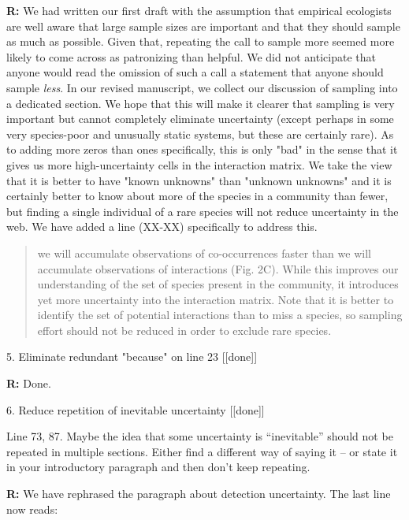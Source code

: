 \documentclass[12pt]{letter}
\newenvironment{refquote}{\bigskip \begin{it}}{\end{it}\smallskip}
\begin{document}
\begin{itemize}
		\textbf{R:} We had written our first draft with the assumption that empirical ecologists are well aware that large sample sizes are important and that they should sample as much as possible. Given that, repeating the call to sample more seemed more likely to come across as patronizing than helpful. We did not anticipate that anyone would read the omission of such a call a statement that anyone should sample \emph{less}. In our revised manuscript, we collect our discussion of sampling into a dedicated section. We hope that this will make it clearer that sampling is very important but cannot completely eliminate uncertainty (except perhaps in some very species-poor and unusually static systems, but these are certainly rare). As to adding more zeros than ones specifically, this is only "bad" in the sense that it gives us more high-uncertainty cells in the interaction matrix. We take the view that it is better to have "known unknowns" than "unknown unknowns" and it is certainly better to know about more of the species in a community than fewer, but finding a single individual of a rare species will not reduce uncertainty in the web. We have added a line (XX-XX) specifically to address this.

		\begin{quotation}
			we will accumulate observations of co-occurrences faster than we will accumulate observations of interactions (Fig. 2C). While this improves our understanding of the set of species present in the community, it introduces yet more uncertainty into the interaction matrix. Note that it is better to identify the set of potential interactions than to miss a species, so sampling effort should not be reduced in order to exclude rare species.
		\end{quotation}


	5. Eliminate redundant "because" on line 23 [[done]]

		\textbf{R:} Done.


	6. Reduce repetition of inevitable uncertainty [[done]]

		\begin{refquote}
		Line 73, 87.  Maybe the idea that some uncertainty is “inevitable” should not be repeated in multiple sections.  Either find a different way of saying it – or state it in your introductory paragraph and then don’t keep repeating.
		\end{refquote}

		\textbf{R:} We have rephrased the paragraph about detection uncertainty. The last line now reads:
			

\end{itemize}
\end{document}
